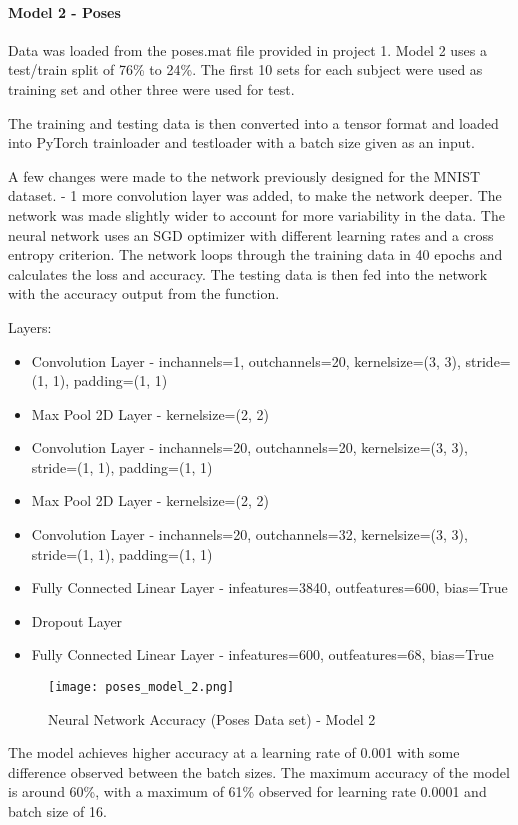 \documentclass[12pt]{article}
\begin{document}
\paragraph{Model 2 - Poses}

Data was loaded from the poses.mat file provided in project 1. Model 2 uses a test/train split of 76\% to 24\%. The first 10 sets for each subject were used as training set and other three were used for test.

The training and testing data is then converted into a tensor format and loaded into PyTorch trainloader and testloader with a batch size given as an input.

A few changes were made to the network previously designed for the MNIST dataset. - 1 more convolution layer was added, to make the network deeper. The network was made slightly wider to account for more variability in the data.  The neural network uses an SGD optimizer with different learning rates and a cross entropy criterion. The network loops through the training data in 40 epochs and calculates the loss and accuracy. The testing data is then fed into the network with the accuracy output from the function.

Layers:
\begin{itemize}
\item Convolution Layer - inchannels=1, outchannels=20, kernelsize=(3, 3), stride=(1, 1), padding=(1, 1)
\item Max Pool 2D Layer -  kernelsize=(2, 2)
\item Convolution Layer - inchannels=20, outchannels=20, kernelsize=(3, 3), stride=(1, 1), padding=(1, 1)
\item Max Pool 2D Layer -  kernelsize=(2, 2)
\item Convolution Layer - inchannels=20, outchannels=32, kernelsize=(3, 3), stride=(1, 1), padding=(1, 1)
\item Fully Connected Linear Layer - infeatures=3840, outfeatures=600, bias=True
\item Dropout Layer
\item Fully Connected Linear Layer - infeatures=600, outfeatures=68, bias=True
\end{itemize}


\begin{figure}[H]
	\texttt{[image: poses\_model\_2.png]}
	\caption{Neural Network Accuracy (Poses Data set) - Model 2}
\end{figure}

The model achieves higher accuracy at a learning rate of 0.001 with some difference observed between the batch sizes. The maximum accuracy of the model is around 60\%, with a maximum of 61\% observed for learning rate 0.0001 and batch size of 16. 
\end{document}
